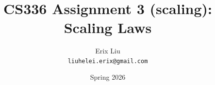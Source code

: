 \documentclass[11pt, a4paper]{article}
\title{%
    CS336 Assignment 3 (scaling): \\
    Scaling Laws
}
\author{Erix Liu \\ \texttt{liuhelei.erix@gmail.com}}
\date{Spring 2026}
\begin{document}
\maketitle
\thispagestyle{empty}

\tableofcontents
\newpage


\FloatBarrier


\clearpage
\begin{appendices}


\end{appendices}
\end{document}
